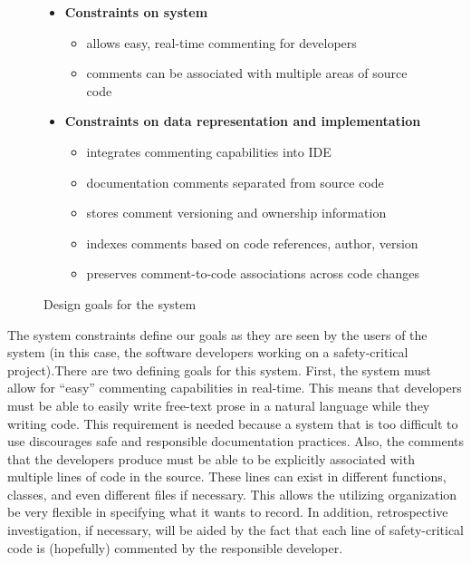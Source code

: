 \begin{figure}[t]
\makebox[\textwidth]{\hrulefill}
\begin{itemize}
  \item \textbf{Constraints on system}
    \begin{itemize}
      \item allows easy, real-time commenting for developers
      \item comments can be associated with multiple areas of source code
    \end{itemize}
  \item \textbf{Constraints on data representation and implementation}
    \begin{itemize}
      \item integrates commenting capabilities into IDE
      \item documentation comments separated from source code
      \item stores comment versioning and ownership information
      \item indexes comments based on code references, author, version
      \item preserves comment-to-code associations across code changes
    \end{itemize}
\end{itemize}
\makebox[\textwidth]{\hrulefill}
\caption{Design goals for the system}
\label{fig:design_criteria}
\end{figure}

The system constraints define our goals as they are seen by the users of the
system (in this case, the software developers working on a safety-critical
project).There are two defining goals for this system. First, the system must
allow for ``easy'' commenting capabilities in real-time. This means that
developers must be able to easily write free-text prose in a natural language
while they writing code. This requirement is needed because a system that is too
difficult to use discourages safe and responsible documentation practices. Also,
the comments that the developers produce must be able to be explicitly
associated with multiple lines of code in the source. These lines can exist in
different functions, classes, and even different files if necessary. This allows
the utilizing organization be very flexible in specifying what it wants
to record. In addition, retrospective investigation, if necessary, will be aided
by the fact that each line of safety-critical code is (hopefully) commented by
the responsible developer.

